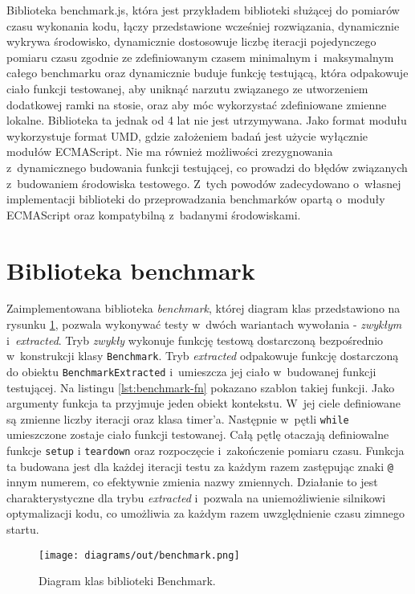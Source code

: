 Biblioteka benchmark.js, która jest przykładem biblioteki służącej do pomiarów czasu wykonania kodu, łączy przedstawione wcześniej rozwiązania, dynamicznie wykrywa środowisko, dynamicznie dostosowuje liczbę iteracji pojedynczego pomiaru czasu zgodnie ze zdefiniowanym czasem minimalnym i~maksymalnym całego benchmarku oraz dynamicznie buduje funkcję testującą, która odpakowuje ciało funkcji testowanej, aby uniknąć narzutu związanego ze utworzeniem dodatkowej ramki na stosie, oraz aby móc wykorzystać zdefiniowane zmienne lokalne. Biblioteka ta jednak od 4 lat nie jest utrzymywana. Jako format modułu wykorzystuje format UMD, gdzie założeniem badań jest użycie wyłącznie modułów ECMAScript. Nie ma również możliwości zrezygnowania z~dynamicznego budowania funkcji testującej, co prowadzi do błędów związanych z~budowaniem środowiska testowego. Z~tych powodów zadecydowano o~własnej implementacji biblioteki do przeprowadzania benchmarków opartą o~moduły ECMAScript oraz kompatybilną z~badanymi środowiskami.

\section{Biblioteka benchmark}
\label{sec:benchmark}

Zaimplementowana biblioteka \textit{benchmark}, której diagram klas przedstawiono na rysunku \ref{fig:benchmark-puml}, pozwala wykonywać testy w~dwóch wariantach wywołania - \textit{zwykłym} i~\textit{extracted}. Tryb \textit{zwykły} wykonuje funkcję testową dostarczoną bezpośrednio w~konstrukcji klasy \lstinline{Benchmark}. Tryb \textit{extracted} odpakowuje funkcję dostarczoną do obiektu \lstinline{BenchmarkExtracted} i~umieszcza jej ciało w~budowanej funkcji testującej. Na listingu \ref{lst:benchmark-fn} pokazano szablon takiej funkcji. Jako argumenty funkcja ta przyjmuje jeden obiekt kontekstu. W~jej ciele definiowane są zmienne liczby iteracji oraz klasa timer'a. Następnie w~pętli \lstinline{while} umieszczone zostaje ciało funkcji testowanej. Całą pętlę otaczają definiowalne funkcje \lstinline{setup} i \lstinline{teardown} oraz rozpoczęcie i~zakończenie pomiaru czasu. Funkcja ta budowana jest dla każdej iteracji testu za każdym razem zastępując znaki \lstinline{@} innym numerem, co efektywnie zmienia nazwy zmiennych. Działanie to jest charakterystyczne dla trybu \textit{extracted} i~pozwala na uniemożliwienie silnikowi optymalizacji kodu, co umożliwia za każdym razem uwzględnienie czasu zimnego startu.

\begin{figure}
  \centering
  \texttt{[image: diagrams/out/benchmark.png]}
  \caption{Diagram klas biblioteki Benchmark.}
  \label{fig:benchmark-puml}
\end{figure}
\clearpage


